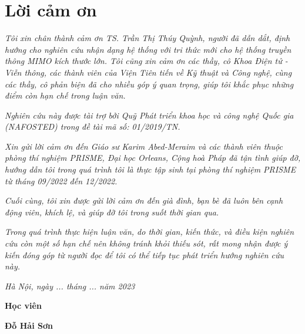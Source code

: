 \clearpage
{}

\chapter*{Lời cảm ơn}

\textit{Tôi xin chân thành cảm ơn TS. Trần Thị Thúy Quỳnh, người đã dẫn dắt, định hướng cho nghiên cứu nhận dạng hệ thống với tri thức mới cho hệ thống truyền thông MIMO kích thước lớn. Tôi cũng xin cảm ơn các thầy, cô Khoa Điện tử - Viễn thông, các thành viên của Viện Tiên tiến về Kỹ thuật và Công nghệ, cùng các thầy, cô phản biện đã cho nhiều góp ý quan trọng, giúp tôi khắc phục những điểm còn hạn chế trong luận văn.}

\textit{Nghiên cứu này được tài trợ bởi Quỹ Phát triển khoa học và công nghệ Quốc gia (NAFOSTED) trong đề tài mã số: 01/2019/TN.}

\textit{Xin gửi lời cảm ơn đến Giáo sư Karim Abed-Meraim và các thành viên thuộc phòng thí nghiệm PRISME, Đại học Orleans, Cộng hoà Pháp đã tận tình giúp đỡ, hướng dẫn tôi trong quá trình tôi là thực tập sinh tại phòng thí nghiệm PRISME từ tháng 09/2022 đến 12/2022.}

\textit{Cuối cùng, tôi xin được gửi lời cảm ơn đến già đình, bạn bè đã luôn bên cạnh động viên, khích lệ, và giúp đỡ tôi trong suốt thời gian qua.}

\textit{Trong quá trình thực hiện luận văn, do thời gian, kiến thức, và điều kiện nghiên cứu còn một số hạn chế nên không tránh khỏi thiếu sót, rất mong nhận được ý kiến đóng góp từ người đọc để tôi có thể tiếp tục phát triển hướng nghiên cứu này.} 

\vspace{1cm}
\hspace{7cm}\textit{Hà Nội, ngày ... tháng ... năm 2023}

\hspace{9.4cm}\textbf{Học viên}
\vspace{2.5cm}


\hspace{9.3cm}\textbf{Đỗ Hải Sơn}
